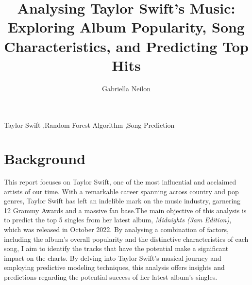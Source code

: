\documentclass[11pt,preprint, authoryear]{elsarticle}
\numberwithin{equation}{section}
\numberwithin{figure}{section}
\numberwithin{table}{section}
\begin{document}
\begin{frontmatter}  %

\title{Analysing Taylor Swift's Music: Exploring Album Popularity, Song
Characteristics, and Predicting Top Hits}





\author[Add1]{Gabriella Neilon}





\address[Add1]{Stellenbosch University}



\vspace{1cm}


\begin{keyword}
\footnotesize{
Taylor Swift \sep Random Forest Algorithm \sep Song Prediction \\
\vspace{0.3cm}
}
\end{keyword}



\vspace{0.5cm}

\end{frontmatter}

\setcounter{footnote}{0}



\pagestyle{fancy}
\chead{}
\rhead{}
\lfoot{}
\lhead{}
\cfoot{}


\headsep 35pt %




\hypertarget{background}{%
\section{\texorpdfstring{Background
\label{Background}}{Background }}\label{background}}

This report focuses on Taylor Swift, one of the most influential and
acclaimed artists of our time. With a remarkable career spanning across
country and pop genres, Taylor Swift has left an indelible mark on the
music industry, garnering 12 Grammy Awards and a massive fan base.The
main objective of this analysis is to predict the top 5 singles from her
latest album, \emph{Midnights (3am Edition)}, which was released in
October 2022. By analysing a combination of factors, including the
album's overall popularity and the distinctive characteristics of each
song, I aim to identify the tracks that have the potential make a
significant impact on the charts. By delving into Taylor Swift's musical
journey and employing predictive modeling techniques, this analysis
offers insights and predictions regarding the potential success of her
latest album's singles.
\end{document}
